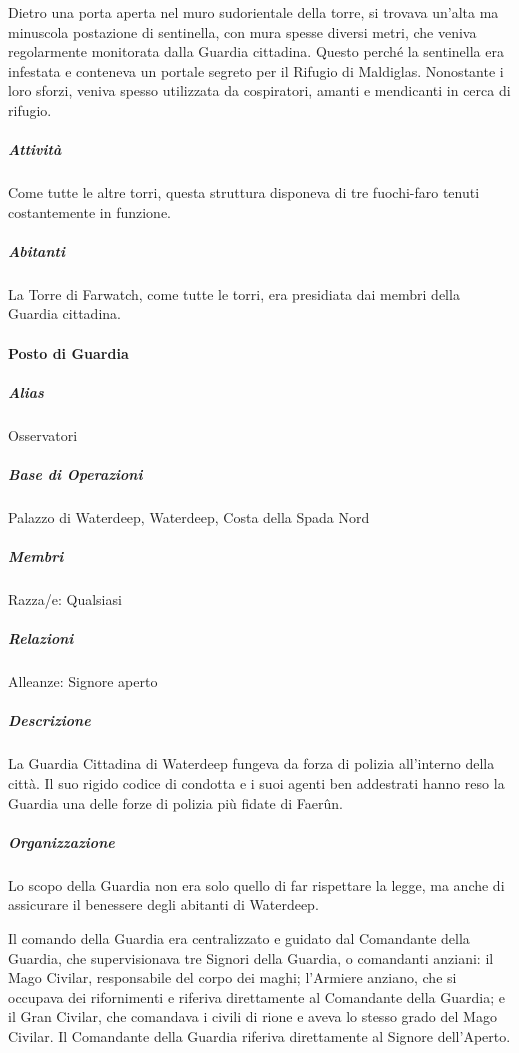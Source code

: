 \documentclass{article}
\begin{document}
                          Dietro una porta aperta nel muro sudorientale della torre, si trovava un'alta ma minuscola postazione di sentinella, con mura spesse diversi metri, che veniva regolarmente monitorata dalla Guardia cittadina. Questo perché la sentinella era infestata e conteneva un portale segreto per il Rifugio di Maldiglas. Nonostante i loro sforzi, veniva spesso utilizzata da cospiratori, amanti e mendicanti in cerca di rifugio.

                                                \subparagraph{Attività}
                          Come tutte le altre torri, questa struttura disponeva di tre fuochi-faro tenuti costantemente in funzione.

                                                \subparagraph{Abitanti}
                          La Torre di Farwatch, come tutte le torri, era presidiata dai membri della Guardia cittadina.

                                            \paragraph{Posto di Guardia}

                                          \subparagraph{\textbf{Alias}}
                        Osservatori

                        \subparagraph{\textbf{Base di Operazioni}}
                        Palazzo di Waterdeep, Waterdeep, Costa della Spada Nord

                        \subparagraph{\textbf{Membri}}
                        Razza/e: Qualsiasi

                        \subparagraph{\textbf{Relazioni}}
                        Alleanze: Signore aperto

                        \subparagraph{\textbf{Descrizione}}
                        La Guardia Cittadina di Waterdeep fungeva da forza di polizia all'interno della città. Il suo rigido codice di condotta e i suoi agenti ben addestrati hanno reso la Guardia una delle forze di polizia più fidate di Faerûn.

                        \subparagraph{\textbf{Organizzazione}}
                        Lo scopo della Guardia non era solo quello di far rispettare la legge, ma anche di assicurare il benessere degli abitanti di Waterdeep.

                        Il comando della Guardia era centralizzato e guidato dal Comandante della Guardia, che supervisionava tre Signori della Guardia, o comandanti anziani: il Mago Civilar, responsabile del corpo dei maghi; l'Armiere anziano, che si occupava dei rifornimenti e riferiva direttamente al Comandante della Guardia; e il Gran Civilar, che comandava i civili di rione e aveva lo stesso grado del Mago Civilar. Il Comandante della Guardia riferiva direttamente al Signore dell'Aperto.
\end{document}
